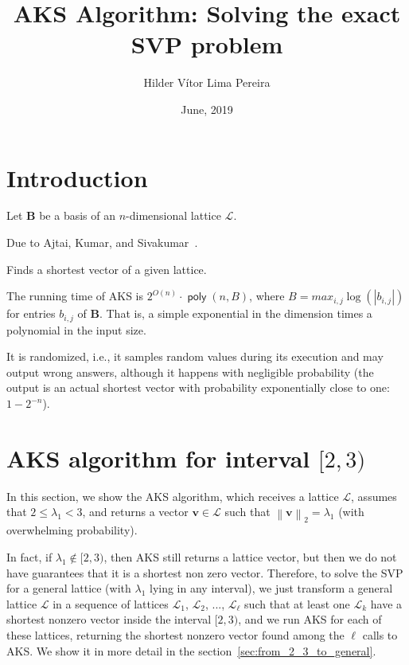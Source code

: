 \documentclass[a4paper,11pt]{article}
\title{AKS Algorithm: Solving the exact SVP problem}
\author{Hilder Vítor Lima Pereira}
\date{June, 2019}
\DeclareMathOperator{\poly}{\textsf{poly}}
\newcommand{\norm}[1]{\left\lVert #1 \right\rVert_2}
\let\vec\mathbf %
\theoremstyle{definition}
\theoremstyle{remark}
\begin{document}
\maketitle


\section{Introduction}

Let $\vec{B}$ be a basis of an $n$-dimensional lattice $\mathcal{L}$.


Due to Ajtai, Kumar, and Sivakumar~\cite{aks2001}. 

Finds a shortest vector of a given lattice.

The running time of AKS is $2^{O(n)}\cdot \poly(n, B)$, where $B = max_{i, 
j}\log(|b_{i,j}|)$ for entries $b_{i,j}$ of $\vec B$. That is, a simple 
exponential in the dimension times a polynomial in the input size.

It is randomized, i.e., it samples random values during its execution and may 
output wrong answers, although it happens with negligible probability (the 
output is an actual shortest vector with probability exponentially close to 
one: $1 - 2^{-n}$).


\section{AKS algorithm for interval $[2, 3)$}

In this section, we show the AKS algorithm, which receives a lattice 
$\mathcal{L}$, assumes that $2 \le \lambda_1 < 3$, and returns a vector $\vec v 
\in \mathcal L$ such that $\norm{\vec v} = \lambda_1$ (with overwhelming 
probability).

In fact, if $\lambda_1 \not \in [2, 3)$, then AKS still returns a lattice 
vector, but then we do not have guarantees that it is a shortest non zero 
vector. Therefore, to solve the SVP for a general lattice (with $\lambda_1$ 
lying in any interval), we just transform a general lattice $\mathcal{L}$ in a 
sequence of lattices $\mathcal{L}_1$, $\mathcal{L}_2$, ..., $\mathcal{L}_\ell$ 
such that at least one $\mathcal{L}_k$ have a shortest nonzero vector inside 
the 
interval $[2, 3)$, and we run AKS for each of these lattices, returning the 
shortest nonzero vector found among the $\ell$ calls to AKS. We show it in more 
detail in the section~\ref{sec:from_2_3_to_general}.
\end{document}
